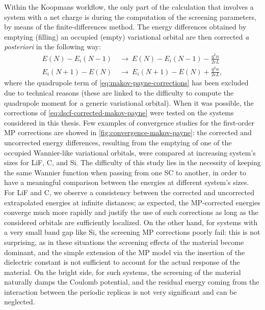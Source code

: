 Within the Koopmans workflow, the only part of the calculation that involves a system with a net charge is during the computation of the screening parameters, by means of the finite-differences method. The energy differences obtained by emptying (filling) an occupied (empty) variational orbital are then corrected \emph{a posteriori} in the following way:
%
\begin{equation}
    \begin{split}
        E(N) - E_i(N-1) \ &\longrightarrow \ E(N) - E_i(N-1) - \frac{q^2 \alpha}{2\epsilon L} \\
        E_i(N+1) - E(N) \ &\longrightarrow \ E_i(N+1) - E(N) + \frac{q^2 \alpha}{2\epsilon L} ,
    \end{split}
    \label{eq:dscf-corrected-makov-payne}
\end{equation}
%
where the quadrupole term of \cref{eq:makov-payne-corrections} has been excluded due to technical reasons (these are linked to the difficulty to compute the quadrupole moment for a generic variational orbital). When it was possible, the corrections of \cref{eq:dscf-corrected-makov-payne} were tested on the systems considered in this thesis. Few examples of convergence studies for the first-order MP corrections are showed in \cref{fig:convergence-makov-payne}: the corrected and uncorrected energy differences, resulting from the emptying of one of the occupied Wannier-like variational orbitals, were compared at increasing system's sizes for LiF, C, and Si. The difficulty of this study lies in the necessity of keeping the same Wannier function when passing from one SC to another, in order to have a meaningful comparison between the energies at different system's sizes. For LiF and C, we observe a consistency between the corrected and uncorrected extrapolated energies at infinite distances; as expected, the MP-corrected energies converge much more rapidly and justify the use of such corrections as long as the considered orbitals are sufficiently localized. On the other hand, for systems with a very small band gap like Si, the screening MP corrections poorly fail: this is not surprising, as in these situations the screening effects of the material become dominant, and the simple extension of the MP model via the insertion of the dielectric constant is not sufficient to account for the actual response of the material. On the bright side, for such systems, the screening of the material naturally damps the Coulomb potential, and the residual energy coming from the interaction between the periodic replicas is not very significant and can be neglected.

